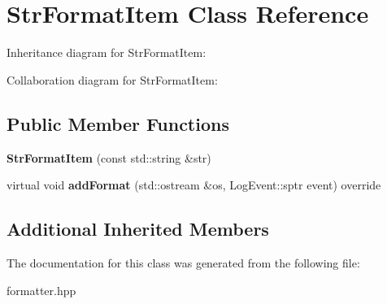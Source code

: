 \hypertarget{classStrFormatItem}{}\section{Str\+Format\+Item Class Reference}
\label{classStrFormatItem}


Inheritance diagram for Str\+Format\+Item\+:


Collaboration diagram for Str\+Format\+Item\+:
\subsection*{Public Member Functions}
\begin{DoxyCompactItemize}
\item 
\mbox{\label{classStrFormatItem_a2504f385b705d1896bdfbebb427fa10a}} 
{\bfseries Str\+Format\+Item} (const std\+::string \&str)
\item 
\mbox{\label{classStrFormatItem_a212d794571283b5ef8cfbc3374b63c91}} 
virtual void {\bfseries add\+Format} (std\+::ostream \&os, Log\+Event\+::sptr event) override
\end{DoxyCompactItemize}
\subsection*{Additional Inherited Members}


The documentation for this class was generated from the following file\+:\begin{DoxyCompactItemize}
\item 
formatter.\+hpp\end{DoxyCompactItemize}
